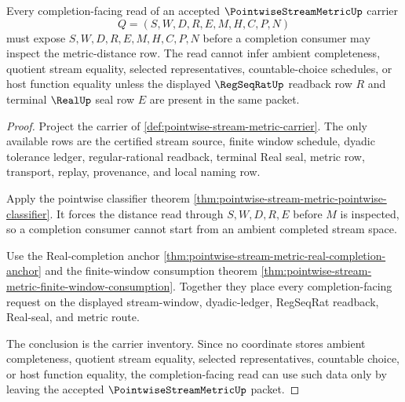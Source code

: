 \begin{theorem}
\label{thm:pointwise-stream-metric-completion-separation}
Every completion-facing read of an accepted $\PointwiseStreamMetricUp$ carrier
$$
Q=(S,W,D,R,E,M,H,C,P,N)
$$
must expose $S,W,D,R,E,M,H,C,P,N$ before a completion consumer may inspect the metric-distance row. The read cannot infer ambient completeness, quotient stream equality, selected representatives, countable-choice schedules, or host function equality unless the displayed $\RegSeqRatUp$ readback row $R$ and terminal $\RealUp$ seal row $E$ are present in the same packet.
\end{theorem}
\begin{proof}
Project the carrier of \autoref{def:pointwise-stream-metric-carrier}. The only available rows are the certified stream source, finite window schedule, dyadic tolerance ledger, regular-rational readback, terminal Real seal, metric row, transport, replay, provenance, and local naming row.

Apply the pointwise classifier theorem \autoref{thm:pointwise-stream-metric-pointwise-classifier}. It forces the distance read through $S,W,D,R,E$ before $M$ is inspected, so a completion consumer cannot start from an ambient completed stream space.

Use the Real-completion anchor \autoref{thm:pointwise-stream-metric-real-completion-anchor} and the finite-window consumption theorem \autoref{thm:pointwise-stream-metric-finite-window-consumption}. Together they place every completion-facing request on the displayed stream-window, dyadic-ledger, RegSeqRat readback, Real-seal, and metric route.

The conclusion is the carrier inventory. Since no coordinate stores ambient completeness, quotient stream equality, selected representatives, countable choice, or host function equality, the completion-facing read can use such data only by leaving the accepted $\PointwiseStreamMetricUp$ packet.
\end{proof}

